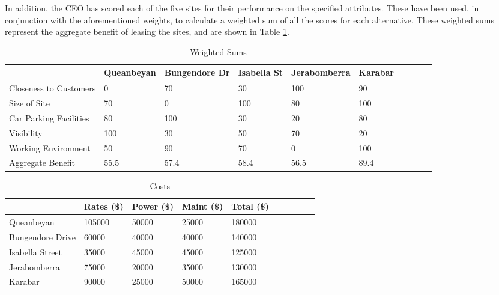 \documentclass[11pt, a4paper]{article}
\begin{document}
    In addition, the CEO has scored each of the five sites for their performance on the specified attributes. These have been used, in conjunction with the aforementioned weights, to calculate a weighted sum of all the scores for each alternative. These weighted sums represent the aggregate benefit of leasing the sites, and are shown in Table \ref{t2}.

    \begin{table}[!ht]
        \centering
        \begin{tabular}{|l|l|l|l|l|l|l|l|l|l|}
        \hline
            ~ & Queanbeyan & Bungendore Dr & Isabella St & Jerabomberra & Karabar      \\ \hline
            Closeness to Customers & 0 & 70 & 30 & 100 & 90      \\ \hline
            Size of Site & 70 & 0 & 100 & 80 & 100      \\ \hline
            Car Parking Facilities & 80 & 100 & 30 & 20 & 80      \\ \hline
            Visibility & 100 & 30 & 50 & 70 & 20      \\ \hline
            Working Environment & 50 & 90 & 70 & 0 & 100      \\ \hline
            Aggregate Benefit & 55.5 & 57.4 & 58.4 & 56.5 & 89.4      \\ \hline
        \end{tabular}
        \caption{Weighted Sums}
        \label{t2}
    \end{table}

    \begin{table}[!ht]
        \centering
        \begin{tabular}{|l|l|l|l|l|l|l|l|l|l|}
        \hline
            ~ & Rates (\$) & Power (\$) & Maint (\$) & Total (\$)       \\ \hline
            Queanbeyan & 105000  & 50000  & 25000  & 180000        \\ \hline
            Bungendore Drive & 60000  & 40000  & 40000  & 140000        \\ \hline
            Isabella Street & 35000  & 45000  & 45000  & 125000        \\ \hline
            Jerabomberra & 75000  & 20000  & 35000  & 130000        \\ \hline
            Karabar & 90000  & 25000  & 50000  & 165000        \\ \hline
        \end{tabular}
        \caption{Costs}
        \label{t3}
    \end{table}
\end{document}
